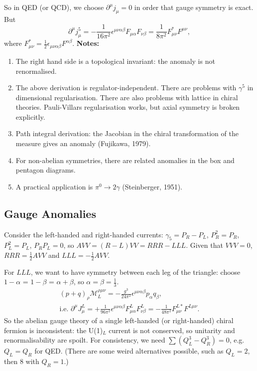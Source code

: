 So in QED (or QCD), we choose $\partial^\mu j_\mu = 0$ in order that gauge symmetry is exact. But 
\begin{equation}
\partial^\mu j_\mu^5 = - \frac{1}{16 \pi^2} \epsilon^{\mu \nu \alpha \beta} F_{\mu \alpha} F_{\nu \beta} = \frac{1}{8 \pi^2} F_{\mu \nu}^* F^{\mu \nu},
\end{equation}
where $F_{\mu \nu}^* = \frac{1}{2} \epsilon_{\mu \nu \alpha \beta} F^{\alpha \beta}$.
\newline
\newline
\textbf{Notes:}
\begin{enumerate}
\item The right hand side is a topological invariant: the anomaly is not renormalised.
\item The above derivation is regulator-independent. There are problems with $\gamma^5$ in dimensional regularisation. There are also problems with lattice in chiral theories. Pauli-Villars regularisation works, but axial symmetry is broken explicitly.
\item Path integral derivation: the Jacobian in the chiral transformation of the measure gives an anomaly (Fujikawa, 1979).
\item For non-abelian symmetries, there are related anomalies in the box and pentagon diagrams.
\item A practical application is $\pi^0 \to 2\gamma$ (Steinberger, 1951).
\end{enumerate}
%
\subsection{Gauge Anomalies}
%
Consider the left-handed and right-handed currents: $\gamma_5 = P_R - P_L$, $P_R^2=P_R$, $P_L^2=P_L$, $P_RP_L=0$, so $AVV = (R-L)VV = RRR - LLL$. Given that $VVV=0$, $RRR = \frac{1}{2}AVV$ and $LLL = -\frac{1}{2}AVV$.

For $LLL$, we want to have symmetry between each leg of the triangle: choose $1-\alpha$ = $1-\beta$ = $\alpha + \beta$, so $\alpha=\beta=\frac{1}{3}$.
\begin{equation}
\begin{split}
(p+q)_\rho \mathcal{M}_L^{\rho \mu \nu} = - \frac{g^3}{24\pi^2} \epsilon^{\mu \nu \alpha \beta} p_\alpha q_\beta, \\
\text{i.e. } \partial^\mu J_\mu^L = + \frac{1}{96\pi^2}\epsilon^{\mu \nu \alpha \beta}F_{\mu \alpha}^L F_{\nu \beta}^L = - \frac{1}{48 \pi^2}F_{\mu \nu}^{L *} F^{L \mu \nu}.
\end{split}
\end{equation}
So the abelian gauge theory of a single left-handed (or right-handed) chiral fermion is inconsistent: the U(1)$_L$ current is not conserved, so unitarity and renormalisability are spoilt. For consistency, we need $\sum (Q_L^3 - Q_R^3)=0$, e.g. $Q_L=Q_R$ for QED. (There are some weird alternatives possible, such as $Q_L=2$, then 8  with $Q_R=1$.)

